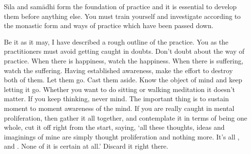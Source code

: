 S\={\i}la and sam\=adhi form the foundation of practice and it is essential to develop them before anything else. You must train yourself and investigate according to the monastic form and ways of practice which have been passed down.

Be it as it may, I have described a rough outline of the practice. You as the practitioners must avoid getting caught in doubts. Don't doubt about the way of practice. When there is happiness, watch the happiness. When there is suffering, watch the suffering. Having established awareness, make the effort to destroy both of them. Let them go. Cast them aside. Know the object of mind and keep letting it go. Whether you want to do sitting or walking meditation it doesn't matter. If you keep thinking, never mind. The important thing is to sustain moment to moment awareness of the mind. If you are really caught in mental proliferation, then gather it all together, and contemplate it in terms of being one whole, cut it off right from the start, saying, `all these thoughts, ideas and imaginings of mine are simply thought proliferation and nothing more. It's all ,  and . None of it is certain at all.' Discard it right there.

